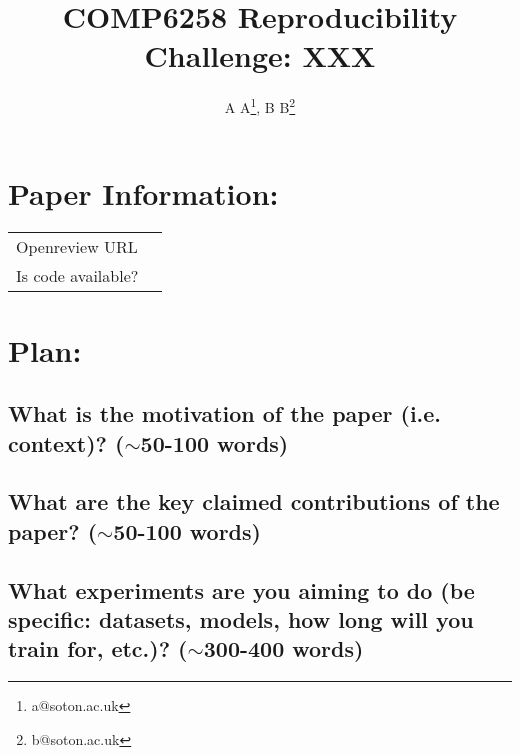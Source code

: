 \documentclass{article}
\title{COMP6258 Reproducibility Challenge: XXX} %
\author{A A\footnote{a@soton.ac.uk}, B B\footnote{b@soton.ac.uk}} %
\begin{document}
\maketitle

\section*{Paper Information:}
\begin{tabular}{lr}
    Openreview URL &  \\
    Is code available? & 
\end{tabular}

\section*{Plan:}

\subsection*{What is the motivation of the paper (i.e. context)? ($\sim$50-100 words)}

\subsection*{What are the key claimed contributions of the paper? ($\sim$50-100 words)}

\subsection*{What experiments are you aiming to do (be specific: datasets, models, how long will you train for, etc.)? ($\sim$300-400 words)}
\end{document}
